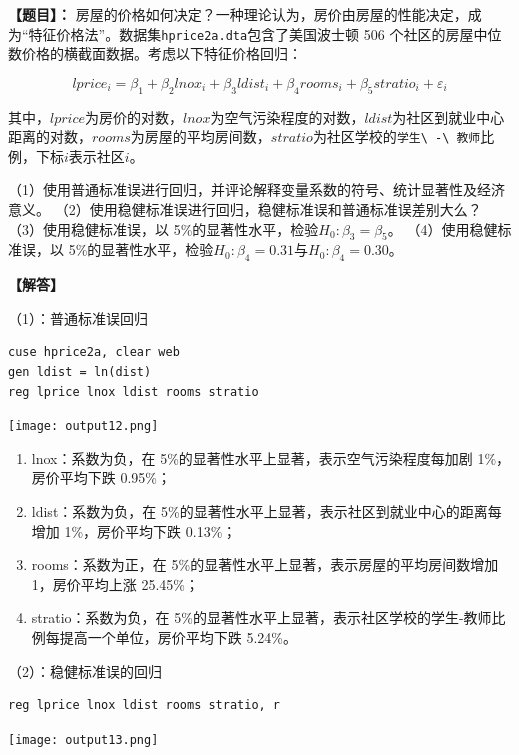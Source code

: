 \documentclass[cn,fancy,blue,11pt]{elegantbook}
\begin{document}
\textbf{【题目】：}
房屋的价格如何决定？一种理论认为，房价由房屋的性能决定，成为``特征价格法''。数据集\lstinline{hprice2a.dta}包含了美国波士顿 506 个社区的房屋中位数价格的横截面数据。考虑以下特征价格回归：

\begin{equation}
  lprice_i = \beta_1 + \beta_2lnox_i + \beta_3ldist_i + \beta_4rooms_i + \beta_5stratio_i + \varepsilon_i
\end{equation}

其中，\(lprice\)为房价的对数，\(lnox\)为空气污染程度的对数，\(ldist\)为社区到就业中心距离的对数，\(rooms\)为房屋的平均房间数，\(stratio\)为社区学校的\lstinline{学生\ -\ 教师}比例，下标\(i\)表示社区\(i\)。

（1）使用普通标准误进行回归，并评论解释变量系数的符号、统计显著性及经济意义。
（2）使用稳健标准误进行回归，稳健标准误和普通标准误差别大么？
（3）使用稳健标准误，以 5\%的显著性水平，检验\(H_0: \beta_3 = \beta_5\)。
（4）使用稳健标准误，以 5\%的显著性水平，检验\(H_0: \beta_4 = 0.31\)与\(H_0: \beta_4 = 0.30\)。

\textbf{【解答】}

（1）：普通标准误回归

\begin{lstlisting}
cuse hprice2a, clear web
gen ldist = ln(dist)
reg lprice lnox ldist rooms stratio
\end{lstlisting}

\noindent\texttt{[image: output12.png]}

\begin{enumerate}
\item
  lnox：系数为负，在 5\%的显著性水平上显著，表示空气污染程度每加剧 1\%，房价平均下跌 0.95\%；
\item
  ldist：系数为负，在 5\%的显著性水平上显著，表示社区到就业中心的距离每增加 1\%，房价平均下跌 0.13\%；
\item
  rooms：系数为正，在 5\%的显著性水平上显著，表示房屋的平均房间数增加 1，房价平均上涨 25.45\%；
\item
  stratio：系数为负，在 5\%的显著性水平上显著，表示社区学校的学生-教师比例每提高一个单位，房价平均下跌 5.24\%。
\end{enumerate}

（2）：稳健标准误的回归

\begin{lstlisting}
reg lprice lnox ldist rooms stratio, r
\end{lstlisting}

\noindent\texttt{[image: output13.png]}
\end{document}
